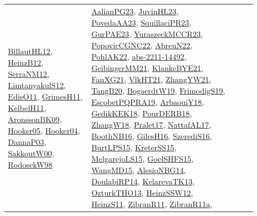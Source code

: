 {\begin{longtable}{lp{3cm}>{\raggedright}p{6cm}>{\raggedright}p{6cm}p{8cm}}
\href{papers/BillautHL12.pdf}{BillautHL12}\cite{BillautHL12}, \href{papers/HeinzB12.pdf}{HeinzB12}\cite{HeinzB12}, \href{papers/SerraNM12.pdf}{SerraNM12}\cite{SerraNM12}, \href{articles/LimtanyakulS12.pdf}{LimtanyakulS12}\cite{LimtanyakulS12}, \href{papers/EdisO11.pdf}{EdisO11}\cite{EdisO11}, \href{papers/GrimesH11.pdf}{GrimesH11}\cite{GrimesH11}, \href{articles/KelbelH11.pdf}{KelbelH11}\cite{KelbelH11}, \href{papers/AronssonBK09.pdf}{AronssonBK09}\cite{AronssonBK09}, \href{articles/Hooker05.pdf}{Hooker05}\cite{Hooker05}, \href{papers/Hooker04.pdf}{Hooker04}\cite{Hooker04}, \href{papers/DannaP03.pdf}{DannaP03}\cite{DannaP03}, \href{articles/SakkoutW00.pdf}{SakkoutW00}\cite{SakkoutW00}, \href{papers/RodosekW98.pdf}{RodosekW98}\cite{RodosekW98} & \href{papers/AalianPG23.pdf}{AalianPG23}\cite{AalianPG23}, \href{papers/JuvinHL23.pdf}{JuvinHL23}\cite{JuvinHL23}, \href{papers/PovedaAA23.pdf}{PovedaAA23}\cite{PovedaAA23}, \href{papers/SquillaciPR23.pdf}{SquillaciPR23}\cite{SquillaciPR23}, \href{articles/GurPAE23.pdf}{GurPAE23}\cite{GurPAE23}, \href{articles/YuraszeckMCCR23.pdf}{YuraszeckMCCR23}\cite{YuraszeckMCCR23}, \href{papers/PopovicCGNC22.pdf}{PopovicCGNC22}\cite{PopovicCGNC22}, \href{articles/AbreuN22.pdf}{AbreuN22}\cite{AbreuN22}, \href{articles/PohlAK22.pdf}{PohlAK22}\cite{PohlAK22}, \href{articles/abs-2211-14492.pdf}{abs-2211-14492}\cite{abs-2211-14492}, \href{papers/GeibingerMM21.pdf}{GeibingerMM21}\cite{GeibingerMM21}, \href{papers/KlankeBYE21.pdf}{KlankeBYE21}\cite{KlankeBYE21}, \href{articles/FanXG21.pdf}{FanXG21}\cite{FanXG21}, \href{articles/VlkHT21.pdf}{VlkHT21}\cite{VlkHT21}, \href{articles/ZhangYW21.pdf}{ZhangYW21}\cite{ZhangYW21}, \href{papers/TangB20.pdf}{TangB20}\cite{TangB20}, \href{papers/BogaerdtW19.pdf}{BogaerdtW19}\cite{BogaerdtW19}, \href{papers/FrimodigS19.pdf}{FrimodigS19}\cite{FrimodigS19}, \href{articles/EscobetPQPRA19.pdf}{EscobetPQPRA19}\cite{EscobetPQPRA19}, \href{papers/ArbaouiY18.pdf}{ArbaouiY18}\cite{ArbaouiY18}, \href{articles/GedikKEK18.pdf}{GedikKEK18}\cite{GedikKEK18}, \href{articles/PourDERB18.pdf}{PourDERB18}\cite{PourDERB18}, \href{articles/ZhangW18.pdf}{ZhangW18}\cite{ZhangW18}, \href{papers/Pralet17.pdf}{Pralet17}\cite{Pralet17}, \href{articles/NattafAL17.pdf}{NattafAL17}\cite{NattafAL17}, \href{papers/BoothNB16.pdf}{BoothNB16}\cite{BoothNB16}, \href{papers/GilesH16.pdf}{GilesH16}\cite{GilesH16}, \href{papers/SzerediS16.pdf}{SzerediS16}\cite{SzerediS16}, \href{papers/BurtLPS15.pdf}{BurtLPS15}\cite{BurtLPS15}, \href{papers/KreterSS15.pdf}{KreterSS15}\cite{KreterSS15}, \href{papers/MelgarejoLS15.pdf}{MelgarejoLS15}\cite{MelgarejoLS15}, \href{articles/GoelSHFS15.pdf}{GoelSHFS15}\cite{GoelSHFS15}, \href{articles/WangMD15.pdf}{WangMD15}\cite{WangMD15}, \href{papers/AlesioNBG14.pdf}{AlesioNBG14}\cite{AlesioNBG14}, \href{papers/DoulabiRP14.pdf}{DoulabiRP14}\cite{DoulabiRP14}, \href{papers/KelarevaTK13.pdf}{KelarevaTK13}\cite{KelarevaTK13}, \href{articles/OzturkTHO13.pdf}{OzturkTHO13}\cite{OzturkTHO13}, \href{articles/HeinzSSW12.pdf}{HeinzSSW12}\cite{HeinzSSW12}, \href{papers/HeinzS11.pdf}{HeinzS11}\cite{HeinzS11}, \href{papers/ZibranR11.pdf}{ZibranR11}\cite{ZibranR11}, \href{papers/ZibranR11a.pdf}{ZibranR11a}\cite{ZibranR11a}, 
\end{longtable}}
